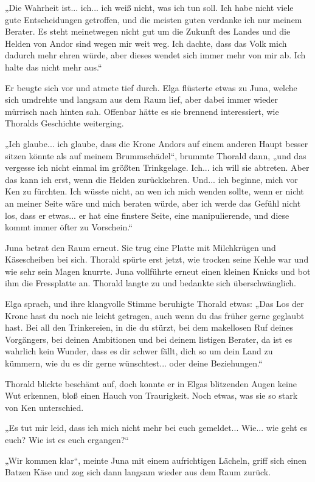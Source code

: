 „Die Wahrheit ist... ich... ich weiß nicht, was ich tun soll. Ich habe nicht viele gute Entscheidungen getroffen, und die meisten guten verdanke ich nur meinem Berater. Es steht meinetwegen nicht gut um die Zukunft des Landes und die Helden von Andor sind wegen mir weit weg. Ich dachte, dass das Volk mich dadurch mehr ehren würde, aber dieses wendet sich immer mehr von mir ab. Ich halte das nicht mehr aus.“

Er beugte sich vor und atmete tief durch. Elga flüsterte etwas zu Juna, welche sich umdrehte und langsam aus dem Raum lief, aber dabei immer wieder mürrisch nach hinten sah. Offenbar hätte es sie brennend interessiert, wie Thoralds Geschichte weiterging.

„Ich glaube... ich glaube, dass die Krone Andors auf einem anderen Haupt besser sitzen könnte als auf meinem Brummschädel“, brummte Thorald dann, „und das vergesse ich nicht einmal im größten Trinkgelage. Ich... ich will sie abtreten. Aber das kann ich erst, wenn die Helden zurückkehren. Und... ich beginne, mich vor Ken zu fürchten. Ich wüsste nicht, an wen ich mich wenden sollte, wenn er nicht an meiner Seite wäre und mich beraten würde, aber ich werde das Gefühl nicht los, dass er etwas... er hat eine finstere Seite, eine manipulierende, und diese kommt immer öfter zu Vorschein.“

Juna betrat den Raum erneut. Sie trug eine Platte mit Milchkrügen und Käsescheiben bei sich. Thorald spürte erst jetzt, wie trocken seine Kehle war und wie sehr sein Magen knurrte. Juna vollführte erneut einen kleinen Knicks und bot ihm die Fressplatte an. Thorald langte zu und bedankte sich überschwänglich.

Elga sprach, und ihre klangvolle Stimme beruhigte Thorald etwas: „Das Los der Krone hast du noch nie leicht getragen, auch wenn du das früher gerne geglaubt hast. Bei all den Trinkereien, in die du stürzt, bei dem makellosen Ruf deines Vorgängers, bei deinen Ambitionen und bei deinem listigen Berater, da ist es wahrlich kein Wunder, dass es dir schwer fällt, dich so um dein Land zu kümmern, wie du es dir gerne wünschtest... oder deine Beziehungen.“

Thorald blickte beschämt auf, doch konnte er in Elgas blitzenden Augen keine Wut erkennen, bloß einen Hauch von Traurigkeit. Noch etwas, was sie so stark von Ken unterschied.

„Es tut mir leid, dass ich mich nicht mehr bei euch gemeldet... Wie... wie geht es euch? Wie ist es euch ergangen?“

„Wir kommen klar“, meinte Juna mit einem aufrichtigen Lächeln, griff sich einen Batzen Käse und zog sich dann langsam wieder aus dem Raum zurück.

